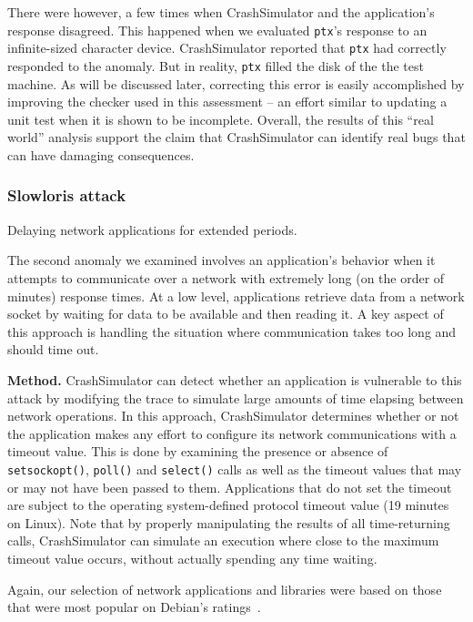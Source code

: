 There were however, a few times when CrashSimulator and the
application's response disagreed.  This
happened when we evaluated {\tt ptx}'s response to an
infinite-sized character device.  CrashSimulator reported that {\tt ptx}
had correctly responded to the anomaly.  But in reality, {\tt ptx} filled the
disk of the the test machine.  As will be discussed later, correcting this
error is easily accomplished by improving the checker used in this
assessment -- an effort similar to updating a unit test when it is shown to
be incomplete.  Overall, the results of this ``real world'' analysis
support the claim that CrashSimulator can identify real bugs that can have
damaging consequences.

\subsubsection{Slowloris attack} Delaying network applications for extended
periods.


The second anomaly we examined involves an application's behavior when it
attempts to communicate over a network with extremely long (on the order of
minutes) response times.  At a low level, applications retrieve data from a
network socket by waiting for data to be available and then reading it.  A
key aspect of this approach is handling the situation where communication
takes too long and should time out.

{\bf Method.} CrashSimulator can detect whether an application is
vulnerable to this attack by modifying the trace to simulate large
amounts of time elapsing between network operations.  In this approach,
CrashSimulator determines whether or not the application makes any effort
to configure its network communications with a timeout value. This is done
by examining the presence or absence of {\tt setsockopt()}, {\tt poll()}
and {\tt select()} calls as well as the timeout values that may or may not
have been passed to them. Applications that do not set the timeout are
subject to the operating system-defined protocol timeout value (19 minutes
on Linux).  Note that by properly manipulating the results of all
time-returning calls, CrashSimulator can simulate an execution where close
to the maximum timeout value occurs, without actually spending any time
waiting.


Again, our selection of network applications and libraries were based on
those that were
most popular on Debian's ratings~\cite{DebPopCon}.

